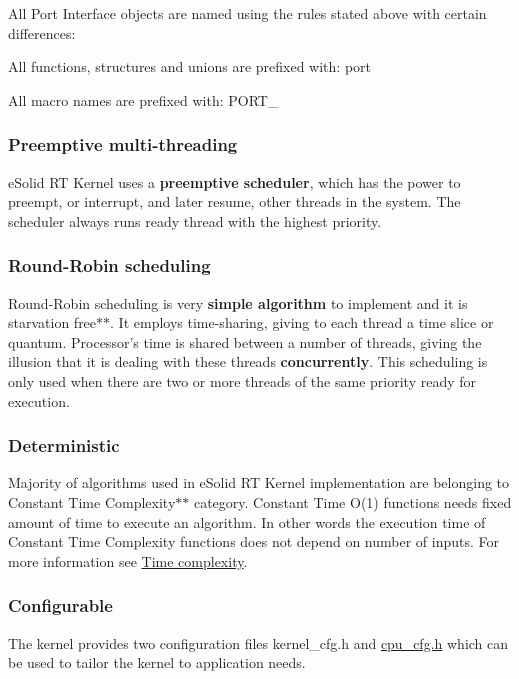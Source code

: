 All Port Interface objects are named using the rules stated above with certain differences\-:
\begin{DoxyItemize}
\item All functions, structures and unions are prefixed with\-: {\ttfamily port}
\item All macro names are prefixed with\-: {\ttfamily P\-O\-R\-T\-\_\-}
\end{DoxyItemize}\hypertarget{index_spec_preempt}{}\subsubsection{Preemptive multi-\/threading}\label{index_spec_preempt}
e\-Solid R\-T Kernel uses a {\bfseries preemptive scheduler}, which has the power to preempt, or interrupt, and later resume, other threads in the system. The scheduler always runs ready thread with the highest priority.\hypertarget{index_spec_rr}{}\subsubsection{Round-\/\-Robin scheduling}\label{index_spec_rr}
Round-\/\-Robin scheduling is very {\bfseries simple algorithm} to implement and it is starvation free$\ast$$\ast$. It employs time-\/sharing, giving to each thread a time slice or {\ttfamily quantum}. Processor's time is shared between a number of threads, giving the illusion that it is dealing with these threads {\bfseries concurrently}. This scheduling is only used when there are two or more threads of the same priority ready for execution.\hypertarget{index_spec_deterministic}{}\subsubsection{Deterministic}\label{index_spec_deterministic}
Majority of algorithms used in e\-Solid R\-T Kernel implementation are belonging to Constant Time Complexity$\ast$$\ast$ category. Constant Time {\ttfamily O(1)} functions needs fixed amount of time to execute an algorithm. In other words the execution time of Constant Time Complexity functions does not depend on number of inputs. For more information see \hyperlink{time_complexity}{Time complexity}.\hypertarget{index_spec_cfg}{}\subsubsection{Configurable}\label{index_spec_cfg}
The kernel provides two configuration files kernel\-\_\-cfg.\-h and \hyperlink{cpu__cfg_8h}{cpu\-\_\-cfg.\-h} which can be used to tailor the kernel to application needs.

